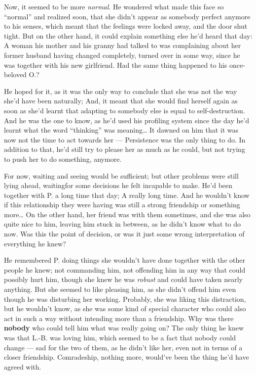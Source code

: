 Now, it seemed to be more \emph{normal}. He wondered what made this face so \enquote{normal} and realized soon, that she didn't appear as somebody perfect anymore to his senses, which meant that the feelings were locked away, and the door shut tight.
But on the other hand, it could explain something else he'd heard that day: A woman his mother and his granny had talked to was complaining about her former husband having changed completely, turned over in some way, since he was together with his new girlfriend. Had the same thing happened to his once-beloved O.?

He hoped for it, as it was the only way to conclude that she was not the way she'd have been naturally; And, it meant that she would find herself again as soon as she'd learnt that adapting to somebody else is equal to self-destruction. And he was the one to know, as he'd used his profiling system since the day he'd learnt what the word \enquote{thinking} was meaning\dots{}
It dawned on him that it was now not the time to act towards her --- Persistence was the only thing to do. In addition to that, he'd still try to please her as much as he could, but not trying to push her to do something, anymore.

For now, waiting and seeing would be sufficient; but other problems were still lying ahead, waitingfor some decisions he felt incapable to make. He'd been together with P. a long time that day; A really long time. And he wouldn't know if this relationship they were having was still a strong friendship or something more\dots{}
On the other hand, her friend was with them sometimes, and she was also quite nice to him, leaving him stuck in between, as he didn't know what to do now. 
Was this the point of decision, or was it just some wrong interpretation of everything he knew?

He remembered P. doing things she wouldn't have done together with the other people he knew; not commanding him, not offending him in any way that could possibly hurt him, though she knew he was \emph{robust} and could have taken nearly anything. But she seemed to like pleasing him, as she didn't offend him even though he was disturbing her working. 
Probably, she was liking this distraction, but he wouldn't know, as she was some kind of special character who could also act in such a way without intending more than a friendship. 
Why was there \textbf{nobody} who could tell him what was really going on? The only thing he knew was that L.-B. was loving him, which seemed to be a fact that nobody could change --- sad for the two of them, as he didn't like her, even not in terms of a closer friendship. Comradeship, nothing more, would've been the thing he'd have agreed with.

